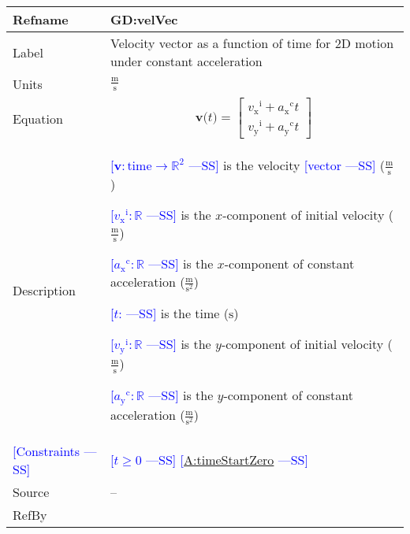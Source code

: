 \documentclass[12pt]{article}
\newcommand{\authornote}[3]{\textcolor{#1}{[#3 ---#2]}}
\newcommand{\authornote}[3]{}
\newcommand{\wss}[1]{\authornote{blue}{SS}{#1}}
\begin{document}
\noindent
\begin{minipage}{\textwidth}
\begin{tabular}{>{\raggedright}p{}>{\raggedright\arraybackslash}p{}}
\toprule \textbf{Refname} & \textbf{GD:velVec}
\label{GD:velVec}
\\ \midrule
Label & Velocity vector as a function of time for 2D motion under constant acceleration
        
\\ \midrule
Units & $\frac{\text{m}}{\text{s}}$
        
\\ \midrule
Equation & \begin{displaymath}
           \symbf{v}\text{(}t\text{)}=\begin{bmatrix}
                                      {{v_{\text{x}}}^{\text{i}}}+{{a_{\text{x}}}^{\text{c}}} t\\
                                      {{v_{\text{y}}}^{\text{i}}}+{{a_{\text{y}}}^{\text{c}}} t
                                      \end{bmatrix}
           \end{displaymath}
\\ \midrule
Description & \begin{symbDescription}
              \item{\wss{$\symbf{v}: \text{time} \rightarrow \mathbb{R}^2$} is the velocity \wss{vector} ($\frac{\text{m}}{\text{s}}$)}
              \item{\wss{${{v_{\text{x}}}^{\text{i}}}: \mathbb{R}$} is the $x$-component of initial velocity ($\frac{\text{m}}{\text{s}}$)}
              \item{\wss{${{a_{\text{x}}}^{\text{c}}}: \mathbb{R}$} is the $x$-component of constant acceleration ($\frac{\text{m}}{\text{s}^{2}}$)}
              \item{\wss{$t$: \text{time}} is the time (${\text{s}}$)}
              \item{\wss{${{v_{\text{y}}}^{\text{i}}}: \mathbb{R}$} is the $y$-component of initial velocity ($\frac{\text{m}}{\text{s}}$)}
              \item{\wss{${{a_{\text{y}}}^{\text{c}}}: \mathbb{R}$} is the $y$-component of constant acceleration ($\frac{\text{m}}{\text{s}^{2}}$)}
              \end{symbDescription}
\\ \midrule

\wss{Constraints} & \wss{$t \geq 0$} \wss{\hyperref[timeStartZero]{A:timeStartZero}}
\\ \midrule

Source & --
         
\\ \midrule
RefBy & 
\\ \bottomrule
\end{tabular}
\end{minipage}
\end{document}
